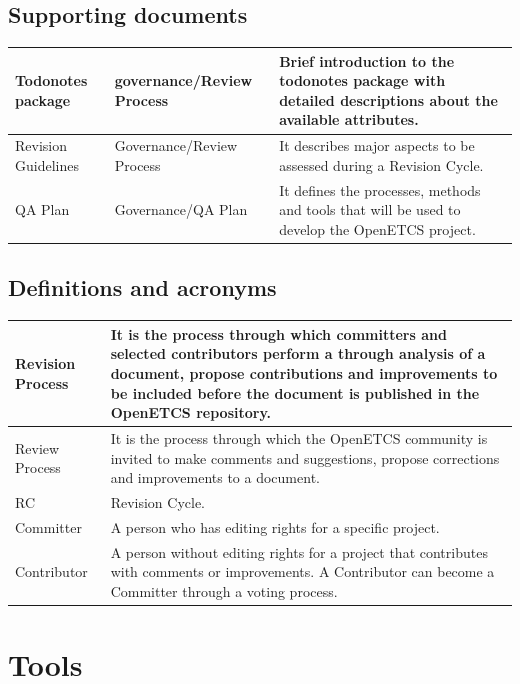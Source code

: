 \documentclass{template/openetcs_article}
\begin{document}
\subsection{Supporting documents}
\tablehead{}
\tabletail{}
\tablelasttail{}
\begin{supertabular}{|m{2cm}m{3cm}m{9cm}|}
\hline
Todonotes package &
governance/Review Process &
Brief introduction to the todonotes package with detailed descriptions about the available attributes. 
\\\hline
Revision Guidelines &
Governance/Review Process &
It describes major aspects to be assessed during a Revision Cycle.
\\\hline
QA Plan &
Governance/QA Plan &
It defines the processes, methods and tools that will be used to develop the OpenETCS project.
\\\hline
\end{supertabular}

\subsection{Definitions and acronyms}
\tablehead{}
\tabletail{}
\tablelasttail{}
\begin{supertabular}{|m{3cm}m{11cm}|}
\hline
Revision Process &
It is the process through which committers and selected contributors perform a through analysis of a document, propose contributions and improvements to be included before the document is published in the OpenETCS repository.
\\\hline
Review Process &
It is the process through which the OpenETCS community is invited to make comments and suggestions, propose corrections and improvements to a document.
\\\hline
RC &
Revision Cycle.
\\\hline
Committer &
A person who has editing rights for a specific project.
\\\hline
Contributor &
A person without editing rights for a project that contributes with comments or improvements. A Contributor can become a Committer through a voting process.
\\\hline  
\end{supertabular}

\section{Tools}
\end{document}
